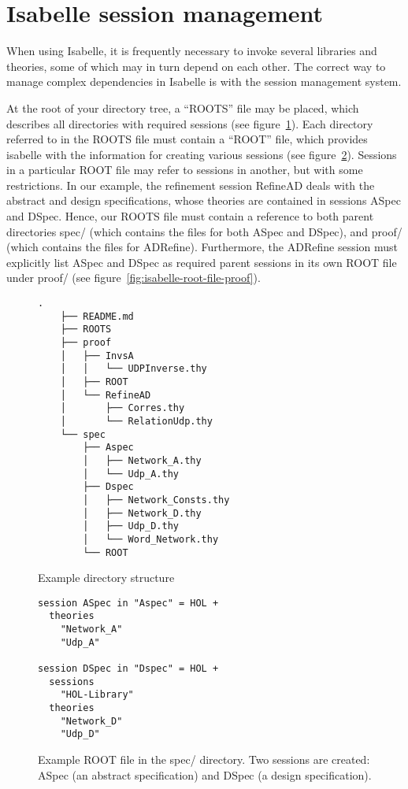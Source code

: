 \documentclass[twoside]{memoir}
\begin{document}
\section{Isabelle session management}
When using Isabelle, it is frequently necessary to invoke several libraries and theories,
some of which may in turn depend on each other.
The correct way to manage complex dependencies in Isabelle is with the session management system.

At the root of your directory tree, a ``ROOTS'' file may be placed, which describes all directories with required sessions (see figure~\ref{fig:isabelle-roots-file}).
Each directory referred to in the ROOTS file must contain a ``ROOT'' file, which provides isabelle with the information for creating various sessions
(see figure~\ref{fig:isabelle-root-file-spec}).
Sessions in a particular ROOT file may refer to sessions in another, but with some restrictions.
In our example, the refinement session RefineAD deals with the abstract and design specifications, whose theories are contained in sessions
ASpec and DSpec.
Hence, our ROOTS file must contain a reference to both parent directories spec/ (which contains the files for both ASpec and DSpec), and proof/
(which contains the files for ADRefine).
Furthermore, the ADRefine session must explicitly list ASpec and DSpec as required parent sessions in its own ROOT file under proof/ (see figure~\ref{fig:isabelle-root-file-proof}).

\begin{figure}[htpb]
    \centering
    \begin{lstlisting}[style=tree, language=file]
    .
    ├── README.md
    ├── ROOTS
    ├── proof
    │   ├── InvsA
    │   │   └── UDPInverse.thy
    │   ├── ROOT
    │   └── RefineAD
    │       ├── Corres.thy
    │       └── RelationUdp.thy
    └── spec
        ├── Aspec
        │   ├── Network_A.thy
        │   └── Udp_A.thy
        ├── Dspec
        │   ├── Network_Consts.thy
        │   ├── Network_D.thy
        │   ├── Udp_D.thy
        │   └── Word_Network.thy
        └── ROOT
    \end{lstlisting}
    
    \caption{Example directory structure}
    \label{fig:isabelle-roots-file}
\end{figure}

\begin{figure}[htpb]
    \centering
    \begin{lstlisting}[language=isabelle]
session ASpec in "Aspec" = HOL +
  theories
    "Network_A"
    "Udp_A"

session DSpec in "Dspec" = HOL +
  sessions
    "HOL-Library"
  theories
    "Network_D"
    "Udp_D"
    \end{lstlisting}
    
    \caption{Example ROOT file in the spec/ directory. Two sessions are created: ASpec (an abstract specification) and DSpec (a design specification).}
    \label{fig:isabelle-root-file-spec}
\end{figure}
\end{document}
